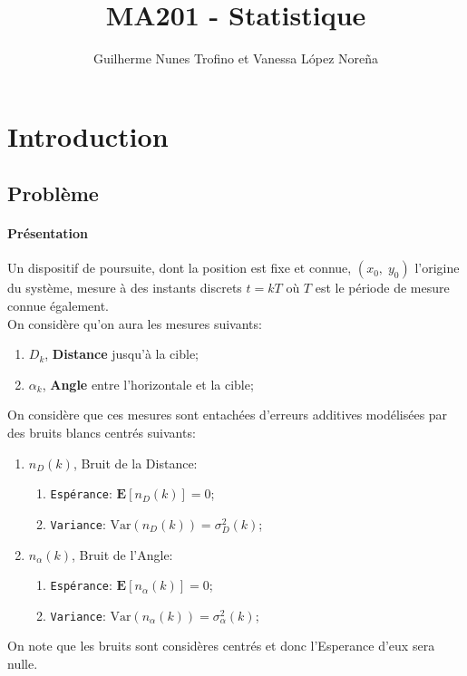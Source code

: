 \documentclass{article}
\title{MA201 - Statistique}
\author{Guilherme Nunes Trofino et Vanessa López Noreña}
\begin{document}
\maketitle

\newpage\tableofcontents

\section*{Introduction}
\subsection*{Problème}
\paragraph{Présentation}Un dispositif de poursuite, dont la position est fixe et connue, $(x_{0}, \; y_{0})$ l'origine du système, mesure à des instants discrets $t = kT$ où $T$ est le période de mesure connue également.\\

\noindent On considère qu'on aura les mesures suivants:
\begin{enumerate}[noitemsep]
    \item $D_{k}$, \textbf{Distance} jusqu'à la cible;
    \item $\alpha_{k}$, \textbf{Angle} entre l'horizontale et la cible;
\end{enumerate}
On considère que ces mesures sont entachées d'erreurs additives modélisées par des bruits blancs centrés suivants:
\begin{enumerate}
    \item $n_{D}(k)$, Bruit de la Distance:
    \begin{enumerate}[noitemsep]
        \item \texttt{Espérance}: $\mathbf{E}[n_{D}(k)] = 0$;
        \item \texttt{Variance}: $\text{Var}(n_{D}(k)) = \sigma_{D}^{2}(k)$;
    \end{enumerate}
    \item $n_{\alpha}(k)$, Bruit de l'Angle:
        \begin{enumerate}[noitemsep]
        \item \texttt{Espérance}: $\mathbf{E}[n_{\alpha}(k)] = 0$;
        \item \texttt{Variance}: $\text{Var}(n_{\alpha}(k)) = \sigma_{\alpha}^{2}(k)$;
    \end{enumerate}
\end{enumerate}
On note que les bruits sont considères centrés et donc l'Esperance d'eux sera nulle.
\end{document}
